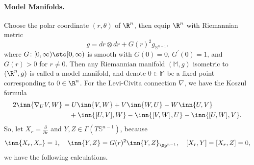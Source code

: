 \paragraph{Model Manifolds.} Choose the polar coordinate $(r,\theta)$ of $\R^n$, then equip $\R^n$ with Riemannian metric
\begin{equation*}
    g = dr \otimes dr + G(r)^2g_{\mathbb{S}^{n-1}}.
\end{equation*}
where $G \colon [0,\infty) \sto [0,\infty)$ is smooth with $G(0) = 0$, $G^\prime(0) = 1$, and $G(r) > 0$ for $r \neq 0$. Then any Riemannian manifold $(\mathbb{M},g)$ isometric to $(\R^n,g)$ is called a model manifold, and denote $0 \in \mathbb{M}$ be a fixed point corresponding to $0 \in \R^n$. For the Levi-Civita connection $\nabla$, we have the Koszul formula
\begin{align*}
    2\inn{\nabla_UV,W} &= U\inn{V,W} + V\inn{W,U} - W\inn{U,V} \\
    &\quad + \inn{[U,V],W} - \inn{[V,W],U} - \inn{[U,W],V}.
\end{align*}
So, let $X_r = \frac{\partial}{\partial r}$ and $Y,Z \in \Gamma(T\mathbb{S}^{n-1})$, because 
\begin{equation*}
    \inn{X_r,X_r} = 1,\quad \inn{Y,Z} = G(r)^2\inn{Y,Z}_{\Sp^{n-1}},\quad [X_r,Y] = [X_r,Z] = 0,
\end{equation*}
we have the following calculations.
